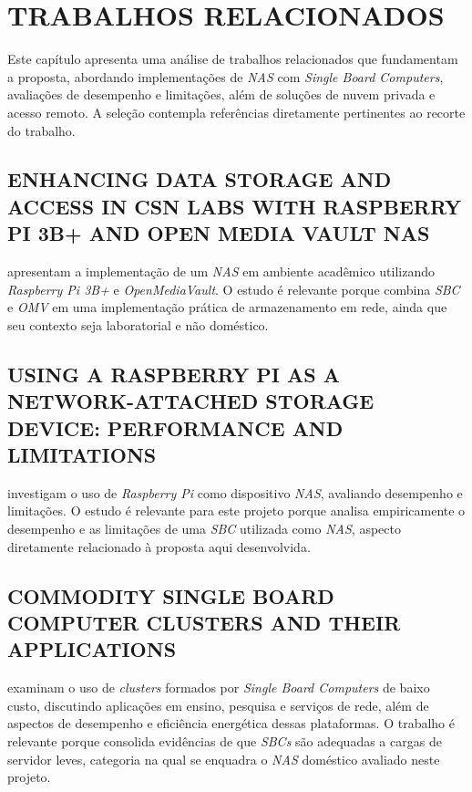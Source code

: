 
\chapter{TRABALHOS RELACIONADOS}
\label{cap:trabalhos-relacionados}

Este capítulo apresenta uma análise de trabalhos relacionados que fundamentam a proposta, abordando implementações de \textit{NAS} com \textit{Single Board Computers}, avaliações de desempenho e limitações, além de soluções de nuvem privada e acesso remoto. A seleção contempla referências diretamente pertinentes ao recorte do trabalho.

\section{ENHANCING DATA STORAGE AND ACCESS IN CSN LABS WITH RASPBERRY PI 3B+ AND OPEN MEDIA VAULT NAS}

 apresentam a implementação de um \textit{NAS} em ambiente acadêmico utilizando \textit{Raspberry Pi 3B+} e \textit{OpenMediaVault}. O estudo é relevante porque combina \textit{SBC} e \textit{OMV} em uma implementação prática de armazenamento em rede, ainda que seu contexto seja laboratorial e não doméstico.

\section{USING A RASPBERRY PI AS A NETWORK-ATTACHED STORAGE DEVICE: PERFORMANCE AND LIMITATIONS}

 investigam o uso de \textit{Raspberry Pi} como dispositivo \textit{NAS}, avaliando desempenho e limitações. O estudo é relevante para este projeto porque analisa empiricamente o desempenho e as limitações de uma \textit{SBC} utilizada como \textit{NAS}, aspecto diretamente relacionado à proposta aqui desenvolvida.

\section{COMMODITY SINGLE BOARD COMPUTER CLUSTERS AND THEIR APPLICATIONS}

 examinam o uso de \textit{clusters} formados por \textit{Single Board Computers} de baixo custo, discutindo aplicações em ensino, pesquisa e serviços de rede, além de aspectos de desempenho e eficiência energética dessas plataformas. O trabalho é relevante porque consolida evidências de que \textit{SBCs} são adequadas a cargas de servidor leves, categoria na qual se enquadra o \textit{NAS} doméstico avaliado neste projeto.

